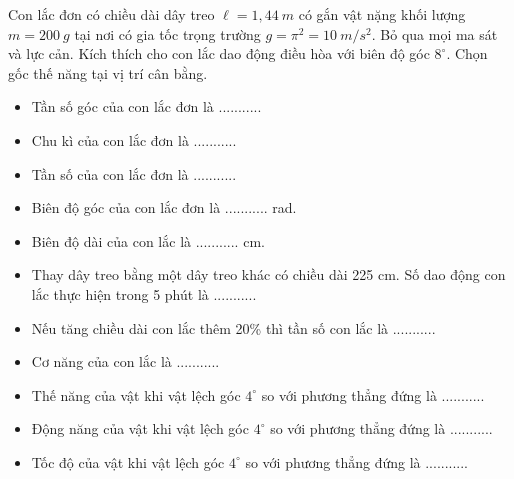 \begin{vidu}
Con lắc đơn có chiều dài dây treo $\ell=1,44\ m$ có gắn vật nặng khối lượng $m=200\ g$ tại nơi có gia tốc trọng trường $g=\pi^2=10\ m/s^2$. Bỏ qua mọi ma sát và lực cản. Kích thích cho con lắc dao động điều hòa với biên độ góc $8^\circ$. Chọn gốc thế năng tại vị trí cân bằng.
 \begin{itemize}
 \item[1.] Tần số góc của con lắc đơn là ........... \item[2.] Chu kì của con lắc đơn là ...........
 \item[3.] Tần số của con lắc đơn là ...........
 \item[4.] Biên độ góc của con lắc đơn là ........... rad.		
 \item[5.] Biên độ dài của con lắc là ........... cm.		
 \item[6.] Thay dây treo bằng một dây treo khác có chiều dài 225 cm. Số dao động con lắc thực hiện trong 5 phút là ...........
\item[7.] Nếu tăng chiều dài con lắc thêm 20\% thì tần số con lắc là ...........
 \item[8.] Cơ năng của con lắc là ...........		
 \item[9.] Thế năng của vật khi vật lệch góc $4^\circ$ so với phương thẳng đứng là ...........		
 \item[10.] Động năng của vật khi vật lệch góc $4^\circ$ so với phương thẳng đứng là ...........		
 \item[11.] Tốc độ của vật khi vật lệch góc $4^\circ$ so với phương thẳng đứng là ...........		
 \end{itemize}
\end{vidu} %
